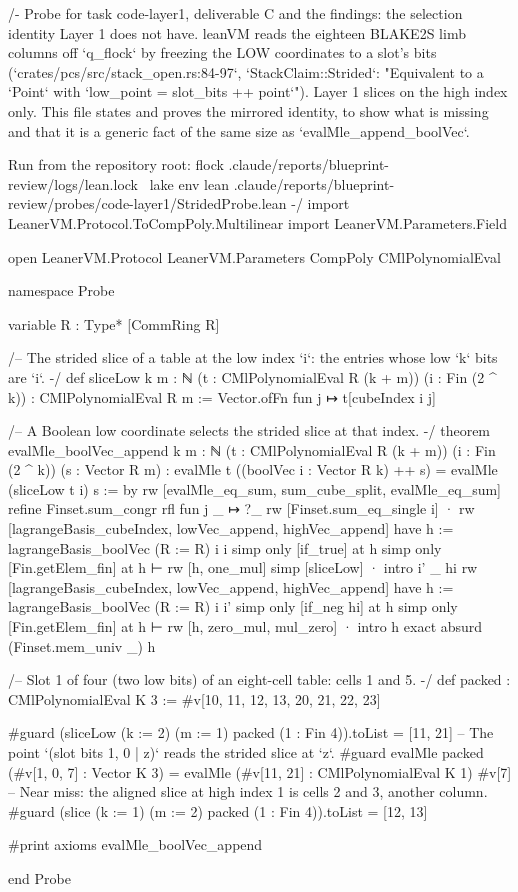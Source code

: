 \begin{leancode}
/-
  Probe for task code-layer1, deliverable C and the findings: the selection identity Layer 1
  does not have. leanVM reads the eighteen BLAKE2S limb columns off `q_flock` by freezing the
  LOW coordinates to a slot's bits (`crates/pcs/src/stack_open.rs:84-97`, `StackClaim::Strided`:
  "Equivalent to a `Point` with `low_point = slot_bits ++ point`"). Layer 1 slices on the high
  index only. This file states and proves the mirrored identity, to show what is missing and
  that it is a generic fact of the same size as `evalMle_append_boolVec`.

  Run from the repository root:
    flock .claude/reports/blueprint-review/logs/lean.lock \
      lake env lean .claude/reports/blueprint-review/probes/code-layer1/StridedProbe.lean
-/
import LeanerVM.Protocol.ToCompPoly.Multilinear
import LeanerVM.Parameters.Field

open LeanerVM.Protocol LeanerVM.Parameters CompPoly CMlPolynomialEval

namespace Probe

variable {R : Type*} [CommRing R]

/-- The strided slice of a table at the low index `i`: the entries whose low `k` bits are `i`. -/
def sliceLow {k m : ℕ} (t : CMlPolynomialEval R (k + m)) (i : Fin (2 ^ k)) :
    CMlPolynomialEval R m :=
  Vector.ofFn fun j ↦ t[cubeIndex i j]

/-- A Boolean low coordinate selects the strided slice at that index. -/
theorem evalMle_boolVec_append {k m : ℕ} (t : CMlPolynomialEval R (k + m)) (i : Fin (2 ^ k))
    (s : Vector R m) :
    evalMle t ((boolVec i : Vector R k) ++ s) = evalMle (sliceLow t i) s := by
  rw [evalMle_eq_sum, sum_cube_split, evalMle_eq_sum]
  refine Finset.sum_congr rfl fun j _ ↦ ?_
  rw [Finset.sum_eq_single i]
  · rw [lagrangeBasis_cubeIndex, lowVec_append, highVec_append]
    have h := lagrangeBasis_boolVec (R := R) i i
    simp only [if_true] at h
    simp only [Fin.getElem_fin] at h ⊢
    rw [h, one_mul]
    simp [sliceLow]
  · intro i' _ hi
    rw [lagrangeBasis_cubeIndex, lowVec_append, highVec_append]
    have h := lagrangeBasis_boolVec (R := R) i i'
    simp only [if_neg hi] at h
    simp only [Fin.getElem_fin] at h ⊢
    rw [h, zero_mul, mul_zero]
  · intro h
    exact absurd (Finset.mem_univ _) h

/-- Slot 1 of four (two low bits) of an eight-cell table: cells 1 and 5. -/
def packed : CMlPolynomialEval K 3 := #v[10, 11, 12, 13, 20, 21, 22, 23]

#guard (sliceLow (k := 2) (m := 1) packed (1 : Fin 4)).toList = [11, 21]
-- The point `(slot bits 1, 0 | z)` reads the strided slice at `z`.
#guard evalMle packed (#v[1, 0, 7] : Vector K 3) =
  evalMle (#v[11, 21] : CMlPolynomialEval K 1) #v[7]
-- Near miss: the aligned slice at high index 1 is cells 2 and 3, another column.
#guard (slice (k := 1) (m := 2) packed (1 : Fin 4)).toList = [12, 13]

#print axioms evalMle_boolVec_append

end Probe
\end{leancode}


